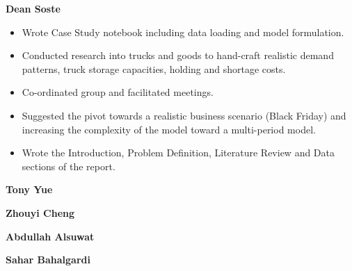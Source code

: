 \documentclass[a4paper,12pt]{article}
\begin{document}
\textbf{Dean Soste}
\begin{itemize}
    \item Wrote Case Study notebook including data loading and model formulation.
    \item Conducted research into trucks and goods to hand-craft realistic demand patterns, truck storage capacities, holding and shortage costs.
    \item Co-ordinated group and facilitated meetings.
    \item Suggested the pivot towards a realistic business scenario (Black Friday) and increasing the complexity of the model toward a multi-period model.
    \item Wrote the Introduction, Problem Definition, Literature Review and Data sections of the report.
\end{itemize}

\textbf{Tony Yue}
\begin{itemize}
\end{itemize}

\textbf{Zhouyi Cheng}
\begin{itemize}
\end{itemize}

\textbf{Abdullah Alsuwat}
\begin{itemize}
\end{itemize}

\textbf{Sahar Bahalgardi}
\begin{itemize}
\end{itemize}
\end{document}
